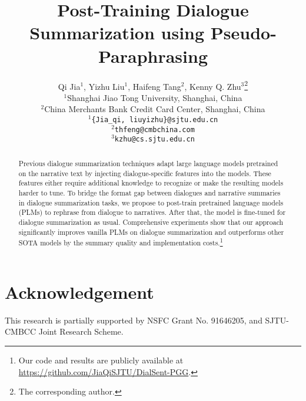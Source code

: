 \documentclass[11pt]{article}
\title{Post-Training Dialogue Summarization using Pseudo-Paraphrasing}
\author{Qi Jia$^1$, Yizhu Liu$^1$, Haifeng Tang$^2$, Kenny Q. Zhu$^3$\thanks{\hspace{2mm}The corresponding author.}\\
	$^1$Shanghai Jiao Tong University, Shanghai, China \\
	$^2$China Merchants Bank Credit Card Center, Shanghai, China \\
	\texttt{$^1$\{Jia\_qi, liuyizhu\}@sjtu.edu.cn} \\
	\texttt{$^2$thfeng@cmbchina.com}\\
	\texttt{$^3$kzhu@cs.sjtu.edu.cn}\\
}
\begin{document}
\maketitle
\begin{abstract}
Previous dialogue summarization techniques adapt large language models pretrained on the narrative text by injecting dialogue-specific features into the models. These features either require additional knowledge to recognize or make the resulting models harder to tune. 
To bridge the format gap between dialogues and narrative summaries in 
dialogue summarization tasks, we propose to post-train pretrained 
language models (PLMs) to rephrase from dialogue to narratives. 
After that, the model is fine-tuned for dialogue summarization as usual. 
Comprehensive experiments show that our approach significantly 
improves vanilla PLMs on dialogue summarization and 
outperforms other SOTA models by the summary quality and 
implementation costs.\footnote{Our code and results are publicly available at \url{https://github.com/JiaQiSJTU/DialSent-PGG}.} 

\end{abstract}




%
%


\section*{Acknowledgement}
This research is partially supported by NSFC Grant No. 91646205, and SJTU-CMBCC Joint Research Scheme.




\clearpage
\newpage
\appendix

\end{document}
